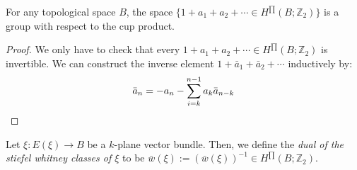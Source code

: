 \begin{lemma} For any topological space $B$, the space $\big\{1+a_1+a_2+\cdots\in H^{\prod}(B;\mathbb{Z}_2)\big\}$ is a group with respect to the cup product.
\end{lemma}
\begin{proof} We only have to check that every $1+a_1+a_2+\cdots\in H^{\prod}(B;\mathbb{Z}_2)$ is invertible. We can construct the inverse element $1+\bar{a}_1+\bar{a}_2+\cdots$ inductively by:
\[\bar{a}_n=-a_n-\sum_{i=k}^{n-1}a_k\bar{a}_{n-k}\qedhere\]
\end{proof}

\begin{definition}\label{def:dual_sw} Let $\xi:E(\xi)\to B$ be a $k$-plane vector bundle. Then, we define the \emph{dual of the stiefel whitney classes of $\xi$} to be $\bar{w}(\xi):=(\bar{w}(\xi))^{-1}\in H^{\prod}(B;\mathbb{Z}_2)$.
\end{definition}


